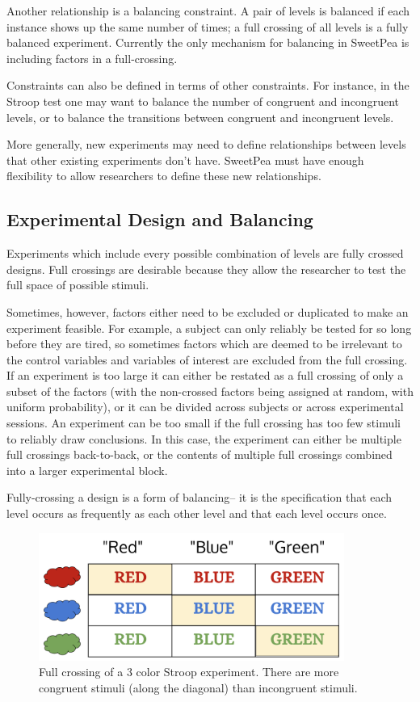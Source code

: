 Another relationship is a balancing constraint. A pair of levels is balanced if each instance shows up the same number of times; a full crossing of all levels is a fully balanced experiment. Currently the only mechanism for balancing in SweetPea is including factors in a full-crossing.

Constraints can also be defined in terms of other constraints. For instance, in the Stroop test one may want to balance the number of congruent and incongruent levels, or to balance the transitions between congruent and incongruent levels.

More generally, new experiments may need to define relationships between levels that other existing experiments don't have. SweetPea must have enough flexibility to allow researchers to define these new relationships.

\subsection{Experimental Design and Balancing}

Experiments which include every possible combination of levels are fully crossed designs. Full crossings are desirable because they allow the researcher to test the full space of possible stimuli.

Sometimes, however, factors either need to be excluded or duplicated to make an experiment feasible. For example, a subject can only reliably be tested for so long before they are tired, so sometimes factors which are deemed to be irrelevant to the control variables and variables of interest are excluded from the full crossing. If an experiment is too large it can either be restated as a full crossing of only a subset of the factors (with the non-crossed factors being assigned at random, with uniform probability), or it can be divided across subjects or across experimental sessions. An experiment can be too small if the full crossing has too few stimuli to reliably draw conclusions. In this case, the experiment can either be multiple full crossings back-to-back, or the contents of multiple full crossings combined into a larger experimental block.

Fully-crossing a design is a form of balancing-- it is the specification that each level occurs as frequently as each other level and that each level occurs once.

\begin{figure}[t]
    \centerline{\includegraphics[origin=c,width=10cm]{fig_weighted_crossing}}
    \caption{Full crossing of a 3 color Stroop experiment. There are more congruent stimuli (along the diagonal) than incongruent stimuli.}%
    \label{fig:weighted_crossing}%
\end{figure}

